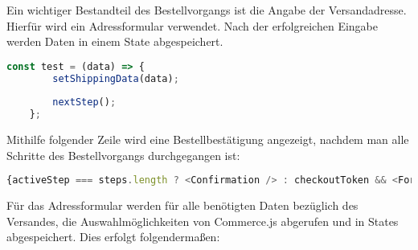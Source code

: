 Ein wichtiger Bestandteil des Bestellvorgangs ist die Angabe der Versandadresse. Hierfür wird ein Adressformular verwendet. Nach der erfolgreichen Eingabe werden Daten in einem State abgespeichert. \\

\begin{lstlisting}[language=JavaScript, caption=Speicherung Daten aus dem Adressformular]
    const test = (data) => {
        setShippingData(data);
    
        nextStep();
    };
\end{lstlisting}

Mithilfe folgender Zeile wird eine Bestellbestätigung angezeigt, nachdem man alle Schritte des Bestellvorgangs durchgegangen ist: 

\begin{lstlisting}[language=JavaScript, caption=Bestellbestätigung]
    {activeStep === steps.length ? <Confirmation /> : checkoutToken && <Form />}
\end{lstlisting}

Für das Adressformular werden für alle benötigten Daten bezüglich des Versandes, die Auswahlmöglichkeiten von Commerce.js abgerufen und in States abgespeichert. Dies erfolgt folgendermaßen: \\

